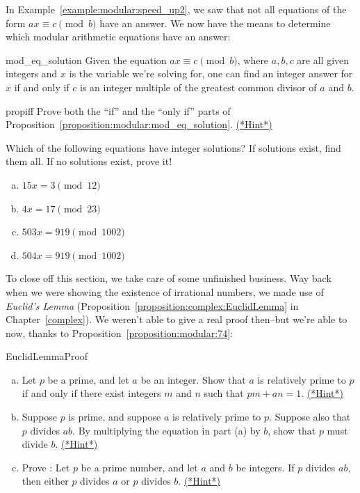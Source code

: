 In Example~\ref{example:modular:speed_up2}, we saw that not all equations of the form $ax \equiv c \pmod b$ have an answer.  We  now have the means to determine which modular arithmetic equations have an answer:

\begin{prop}{mod_eq_solution} 
Given the equation $ax \equiv c\pmod{b}$, where $a,b,c$ are all given integers and $x$ is the variable we're solving for, one can find an integer answer for $x$ if and only if $c$ is an integer multiple of the greatest common divisor of $a$ and $b$.  
\end{prop}

\begin {exercise}{propiff}
Prove both the ``if''  and the ``only if'' parts of Proposition~\ref{proposition:modular:mod_eq_solution}.
\hyperref[sec:modular_arithmetic:hints]{(*Hint*)}
\end{exercise}


\begin{exercise}{}
Which of the following equations have integer solutions? If solutions exist, find them all. If no solutions exist, prove it!
\begin{enumerate}[(a)]
\item
$15x = 3 \pmod{12}$
\item
$4x = 17 \pmod{23}$
\item
$503x = 919 \pmod{1002}$
\item
$504x = 919 \pmod{1002}$
\end{enumerate}

\end{exercise}

To close off this section, we take care of some unfinished business. Way back when we were showing the existence of irrational numbers, we made use of \emph{Euclid's Lemma} (Proposition~\ref{proposition:complex:EuclidLemma} in Chapter~\ref{complex}). We weren't able to give a real proof then--but we're able to now, thanks to Proposition~\ref{proposition:modular:74}:

\begin{exercise}{EuclidLemmaProof}
\begin{enumerate}[(a)]
\item
Let  $p$ be a prime, and let  $a$ be an integer.  Show that $a$ is relatively prime to $p$  if and only if there exist integers $m$ and $n$ such that $pm + an=1$.
\hyperref[sec:modular_arithmetic:hints]{(*Hint*)}
\item
Suppose $p$ is prime, and suppose $a$ is relatively prime to $p$.  Suppose also that $p$ divides $ab$. By multiplying the equation in part (a) by $b$, show that $p$ must divide $b$.
\hyperref[sec:modular_arithmetic:hints]{(*Hint*)}
\item
Prove :  Let $p$ be a prime number, and let $a$ and $b$ be integers. If $p$ divides $ab$, then either $p$ divides $a$ or $p$ divides $b$.
\hyperref[sec:modular_arithmetic:hints]{(*Hint*)}
\end{enumerate}
\end{exercise}


